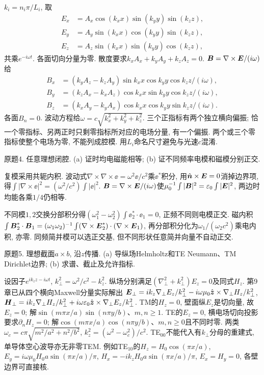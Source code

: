 \begin{solution}
$k_i=n_i\pi/L_i$, 取
\[
\begin{aligned}
E_x&=A_x\cos(k_xx)\sin(k_yy)\sin(k_zz),\\
E_y&=A_y\sin(k_xx)\cos(k_yy)\sin(k_zz),\\
E_z&=A_z\sin(k_xx)\sin(k_yy)\cos(k_zz),
\end{aligned}
\]
共乘$e^{-i\omega t}$. 各面切向分量为零. 散度要求$k_xA_x+k_yA_y+k_zA_z=0$. $\boldsymbol{B}=\nabla\times\boldsymbol{E}/(i\omega)$给
\[
\begin{aligned}
B_x&=(k_yA_z-k_zA_y)\sin k_xx\cos k_yy\cos k_zz/(i\omega),\\
B_y&=(k_zA_x-k_xA_z)\cos k_xx\sin k_yy\cos k_zz/(i\omega),\\
B_z&=(k_xA_y-k_yA_x)\cos k_xx\cos k_yy\sin k_zz/(i\omega).
\end{aligned}
\]
各面$B_n=0$. 波动方程给$\omega=c\sqrt{k_x^2+k_y^2+k_z^2}$. 三个正指标有两个独立横向偏振; 恰一个零指标、另两正时只剩零指标所对应的电场分量, 有一个偏振. 两个或三个零指标使整个电场为零, 不能列成腔模. 用$L_i$命名尺寸避免与光速$c$混淆.
\end{solution}
\begin{exercise}
原题4. 任意理想闭腔. (a) 证时均电磁能相等; (b) 证不同频率电模和磁模分别正交.
\end{exercise}
\begin{solution}
复模采用共轭内积. 波动式$\nabla\times\nabla\times\ee=\omega^2\ee/c^2$乘$\ee^*$积分, 用$\hat{\boldsymbol{n}}\times\boldsymbol{E}=0$消掉边界项, 得$\int|\nabla\times\ee|^2=(\omega^2/c^2)\int|\ee|^2$. $\boldsymbol{B}=\nabla\times\boldsymbol{E}/(i\omega)$使$\mu_0^{-1}\int|\boldsymbol{B}|^2=\varepsilon_0\int|\boldsymbol{E}|^2$, 两边时均能各乘$1/4$仍相等.

不同模$1,2$交换分部积分得$(\omega_1^2-\omega_2^2)\int\ee_2^*\cdot\ee_1=0$, 正频不同则电模正交. 磁内积$\int\boldsymbol{B}_2^*\cdot\boldsymbol{B}_1=(\omega_1\omega_2)^{-1}\int(\nabla\times\boldsymbol{E}_2^*)\cdot(\nabla\times\boldsymbol{E}_1)$, 再分部积分化为$\omega_1/(\omega_2c^2)$乘电内积, 亦零. 同频简并模可以选正交基, 但不同形状任意简并向量不自动正交.
\end{solution}
\begin{exercise}
原题5. 理想截面$a\times b$, 沿$z$传播. (a) 导纵场Helmholtz和TE Neumann、TM Dirichlet边界; (b) 求谱、截止及允许指标.
\end{exercise}
\begin{solution}
设因子$e^{ik_zz-i\omega t}$, $k_\perp^2=\omega^2/c^2-k_z^2$. 纵场分别满足$(\nabla_\perp^2+k_\perp^2)E_z=0$及同式$H_z$. 第9章已从四个横向Maxwell分量实际解出
$\boldsymbol{E}_\perp=ik_z\nabla_\perp E_z/k_\perp^2-i\omega\mu_0\hat{\boldsymbol{z}}\times\nabla_\perp H_z/k_\perp^2$,
$\boldsymbol{H}_\perp=ik_z\nabla_\perp H_z/k_\perp^2+i\omega\varepsilon_0\hat{\boldsymbol{z}}\times\nabla_\perp E_z/k_\perp^2$.
TM的$H_z=0$, 壁面纵$E_z$是切向量, 故$E_z=0$; 解$\sin(m\pi x/a)\sin(n\pi y/b)$、$m,n\ge1$. TE的$E_z=0$, 横电场切向投影要求$\partial_nH_z=0$; 解$\cos(m\pi x/a)\cos(n\pi y/b)$、$m,n\ge0$且不同时零. 两类$\omega_c=c\pi\sqrt{m^2/a^2+n^2/b^2}$, $k_z^2=(\omega^2-\omega_c^2)/c^2$. TE$_{00}$不能代入有$k_\perp$分母的重建式, 单导体空心波导亦无非零TEM. 例如TE$_{10}$的$H_z=H_0\cos(\pi x/a)$, $E_y=i\omega\mu_0H_0a\sin(\pi x/a)/\pi$, $H_x=-ik_zH_0a\sin(\pi x/a)/\pi$, $E_x=H_y=0$, 各壁边界可直接核.
\end{solution}
